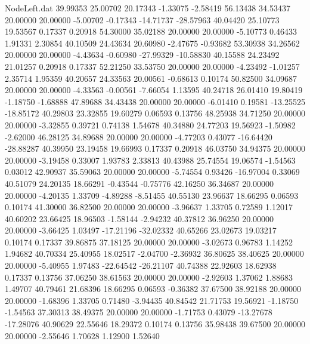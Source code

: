 \begin{filecontents}{NodeLeft.dat}
  39.99353   25.00702   20.17343    -1.33075   -2.58419   56.13438   34.53437   20.00000   20.00000   -5.00702   -0.17343  -14.71737  -28.57963
  40.04420   25.10773   19.53567     0.17337    0.20918   54.30000   35.02188   20.00000   20.00000   -5.10773    0.46433    1.91331    2.30854
  40.10509   24.43634   20.60980    -2.47675   -0.93682   53.30938   34.26562   20.00000   20.00000   -4.43634   -0.60980  -27.99329  -10.58830
  40.15588   24.23492   21.01257     0.20918    0.17337   52.21250   33.53750   20.00000   20.00000   -4.23492   -1.01257    2.35714    1.95359
  40.20657   24.33563   20.00561    -0.68613    0.10174   50.82500   34.09687   20.00000   20.00000   -4.33563   -0.00561   -7.66054    1.13595
  40.24718   26.01410   19.80419    -1.18750   -1.68888   47.89688   34.43438   20.00000   20.00000   -6.01410    0.19581  -13.25525  -18.85172
  40.29803   23.32855   19.60279     0.06593    0.13756   48.25938   34.71250   20.00000   20.00000   -3.32855    0.39721    0.74138    1.54678
  40.34880   24.77203   19.56923    -1.50982   -2.62000   46.28125   34.89688   20.00000   20.00000   -4.77203    0.43077  -16.64420  -28.88287
  40.39950   23.19458   19.66993     0.17337    0.20918   46.03750   34.94375   20.00000   20.00000   -3.19458    0.33007    1.93783    2.33813
  40.43988   25.74554   19.06574    -1.54563    0.03012   42.90937   35.59063   20.00000   20.00000   -5.74554    0.93426  -16.97004    0.33069
  40.51079   24.20135   18.66291    -0.43544   -0.75776   42.16250   36.34687   20.00000   20.00000   -4.20135    1.33709   -4.89288   -8.51455
  40.55130   23.96637   18.66295     0.06593    0.10174   41.30000   36.82500   20.00000   20.00000   -3.96637    1.33705    0.72589    1.12017
  40.60202   23.66425   18.96503    -1.58144   -2.94232   40.37812   36.96250   20.00000   20.00000   -3.66425    1.03497  -17.21196  -32.02332
  40.65266   23.02673   19.03217     0.10174    0.17337   39.86875   37.18125   20.00000   20.00000   -3.02673    0.96783    1.14252    1.94682
  40.70334   25.40955   18.02517    -2.04700   -2.36932   36.80625   38.40625   20.00000   20.00000   -5.40955    1.97483  -22.64542  -26.21107
  40.74388   22.92603   18.62938     0.17337    0.13756   37.06250   38.61563   20.00000   20.00000   -2.92603    1.37062    1.88683    1.49707
  40.79461   21.68396   18.66295     0.06593   -0.36382   37.67500   38.92188   20.00000   20.00000   -1.68396    1.33705    0.71480   -3.94435
  40.84542   21.71753   19.56921    -1.18750   -1.54563   37.30313   38.49375   20.00000   20.00000   -1.71753    0.43079  -13.27678  -17.28076
  40.90629   22.55646   18.29372     0.10174    0.13756   35.98438   39.67500   20.00000   20.00000   -2.55646    1.70628    1.12900    1.52640

\end{filecontents}
